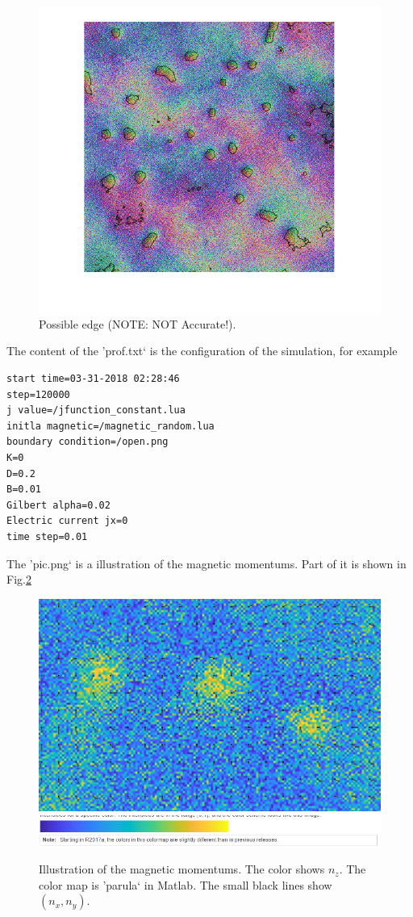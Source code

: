 \documentclass[aps,superscriptaddress,groupedaddress]{revtex4}  %
\begin{document}
\begin{figure}
\includegraphics[scale=0.5]{edges.png}
\caption{\label{Fig:edge}Possible edge (NOTE: NOT Accurate!).}
\end{figure}

The content of the 'prof.txt` is the configuration of the simulation, for example
\begin{lstlisting}
start time=03-31-2018 02:28:46
step=120000
j value=/jfunction_constant.lua
initla magnetic=/magnetic_random.lua
boundary condition=/open.png
K=0
D=0.2
B=0.01
Gilbert alpha=0.02
Electric current jx=0
time step=0.01
\end{lstlisting}

The 'pic.png` is a illustration of the magnetic momentums. Part of it is shown in Fig.\ref{Fig:output2}
\begin{figure}
\includegraphics[scale=0.5]{output2.png}
\includegraphics[scale=0.5]{parula.png}
\caption{\label{Fig:output2}Illustration of the magnetic momentums. The color shows $n_z$. The color map is 'parula` in Matlab. The small black lines show $(n_x,n_y)$.}
\end{figure}
\end{document}
